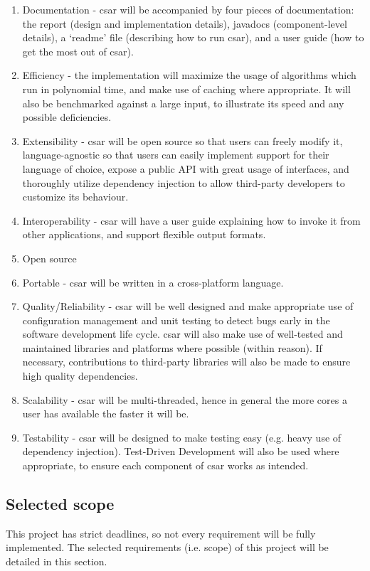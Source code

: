\documentclass[12pt, letterpaper]{article}
\begin{document}
\begin{enumerate}
  \item Documentation - csar will be accompanied by four pieces of documentation: the report (design and implementation details), javadocs (component-level details), a `readme' file (describing how to run csar), and a user guide (how to get the most out of csar).
  \item Efficiency - the implementation will maximize the usage of algorithms which run in polynomial time, and make use of caching where appropriate.
  It will also be benchmarked against a large input, to illustrate its speed and any possible deficiencies.
  \item Extensibility - csar will be open source so that users can freely modify it, language-agnostic so that users can easily implement support for their language of choice, expose a public API with great usage of interfaces, and thoroughly utilize dependency injection to allow third-party developers to customize its behaviour.
  \item Interoperability - csar will have a user guide explaining how to invoke it from other applications, and support flexible output formats.
  \item Open source
  \item Portable - csar will be written in a cross-platform language.
  \item Quality/Reliability - csar will be well designed and make appropriate use of configuration management and unit testing to detect bugs early in the software development life cycle.
  csar will also make use of well-tested and maintained libraries and platforms where possible (within reason).
  If necessary, contributions to third-party libraries will also be made to ensure high quality dependencies.
  \item Scalability - csar will be multi-threaded, hence in general the more cores a user has available the faster it will be.
  \item Testability - csar will be designed to make testing easy (e.g. heavy use of dependency injection).
  Test-Driven Development will also be used where appropriate, to ensure each component of csar works as intended.
\end{enumerate}

\subsection{Selected scope}
\label{sec:SelectedScope}
This project has strict deadlines, so not every requirement will be fully implemented.
The selected requirements (i.e. scope) of this project will be detailed in this section.
\end{document}
